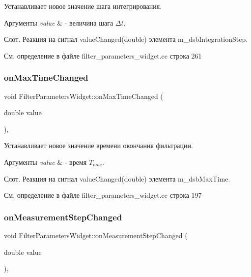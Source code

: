 Устанавливает новое значение шага интегрирования. 


\begin{DoxyParams}{Аргументы}
{\em value} & -\/ величина шага $\Delta t$.\\
\hline
\end{DoxyParams}
Слот. Реакция на сигнал value\+Changed(double) элемента m\+\_\+dsb\+Integration\+Step. 

См. определение в файле filter\+\_\+parameters\+\_\+widget.\+cc строка 261

\hypertarget{class_filter_parameters_widget_a80199438a8dededc61f17d7acd0e2487}{}\label{class_filter_parameters_widget_a80199438a8dededc61f17d7acd0e2487} 
\subsubsection{\texorpdfstring{on\+Max\+Time\+Changed}{onMaxTimeChanged}}
{\footnotesize\ttfamily void Filter\+Parameters\+Widget\+::on\+Max\+Time\+Changed (\begin{DoxyParamCaption}\item[{double}]{value }\end{DoxyParamCaption})\hspace{0.3cm}{\ttfamily [private]}, {\ttfamily [slot]}}



Устанавливает новое значение времени окончания фильтрации. 


\begin{DoxyParams}{Аргументы}
{\em value} & -\/ время $T_{max}$.\\
\hline
\end{DoxyParams}
Слот. Реакция на сигнал value\+Changed(double) элемента m\+\_\+dsb\+Max\+Time. 

См. определение в файле filter\+\_\+parameters\+\_\+widget.\+cc строка 197

\hypertarget{class_filter_parameters_widget_afdabd842b69fd6a4b65b4d44a5c81c55}{}\label{class_filter_parameters_widget_afdabd842b69fd6a4b65b4d44a5c81c55} 
\subsubsection{\texorpdfstring{on\+Measurement\+Step\+Changed}{onMeasurementStepChanged}}
{\footnotesize\ttfamily void Filter\+Parameters\+Widget\+::on\+Measurement\+Step\+Changed (\begin{DoxyParamCaption}\item[{double}]{value }\end{DoxyParamCaption})\hspace{0.3cm}{\ttfamily [private]}, {\ttfamily [slot]}}



